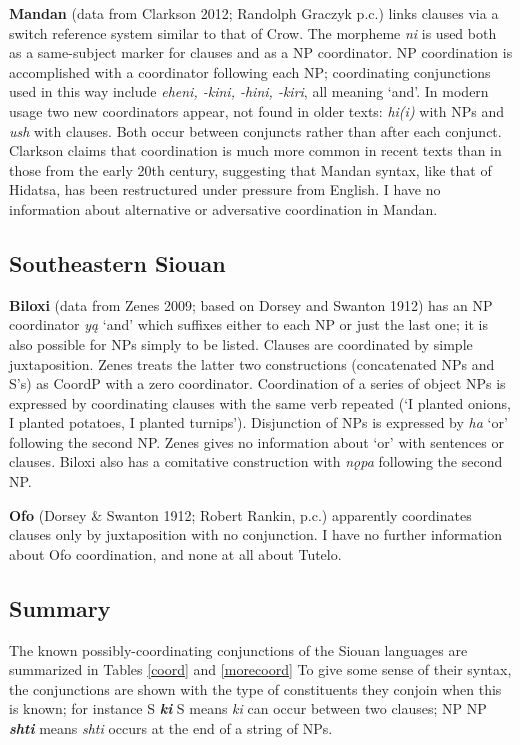 \documentclass[output=paper]{LSP/langsci}
\begin{document}
\textbf{Mandan} (data from Clarkson 2012; Randolph Graczyk p.c.) links clauses via a switch reference system similar to that of Crow. The morpheme \textit{ni} is used both as a same-subject marker for clauses and as a NP coordinator. NP coordination is accomplished with a coordinator following each NP; coordinating conjunctions used in this way include \textit{eheni, -kini, -hini, -kiri}, all meaning `and'. In modern usage two new coordinators appear, not found in older texts: \textit{hi(i)} with NPs and \textit{ush} with clauses. Both occur between conjuncts rather than after each conjunct. Clarkson claims that coordination is much more common in recent texts than in those from the early 20th century, suggesting that Mandan syntax, like that of Hidatsa, has been restructured under pressure from English. I have no information about alternative or adversative coordination in Mandan.  

\subsection{Southeastern Siouan}
 
\textbf{Biloxi} (data from Zenes 2009; based on Dorsey and Swanton 1912) has an NP coordinator \textit{y\k{a}} `and' which suffixes either to each NP or just the last one; it is also possible for NPs simply to be listed. Clauses are coordinated by simple juxtaposition. Zenes treats the latter two constructions (concatenated NPs and S's) as CoordP with a zero coordinator. Coordination of a series of object NPs is expressed by coordinating clauses with the same verb repeated (`I planted onions, I planted potatoes, I planted turnips'). Disjunction of NPs is expressed by \textit{ha} `or' following the second NP. Zenes gives no information about `or' with sentences or clauses. Biloxi also has a comitative construction with \textit{n\k{o}pa} following the second NP.

\textbf{Ofo} (Dorsey \& Swanton 1912; Robert Rankin, p.c.) apparently coordinates clauses only by juxtaposition with no conjunction. I have no further information about Ofo coordination, and none at all about Tutelo.

\subsection{Summary}

The known possibly-coordinating conjunctions of the Siouan languages are summarized in Tables \ref{coord} and \ref{morecoord} To give some sense of their syntax, the conjunctions are shown with the type of constituents they conjoin when this is known; for instance S \textit{\textbf{ki}} S means \textit{ki} can occur between two clauses; NP NP \textit{\textbf {shti}} means \textit {shti} occurs at the end of a string of NPs.
\end{document}
